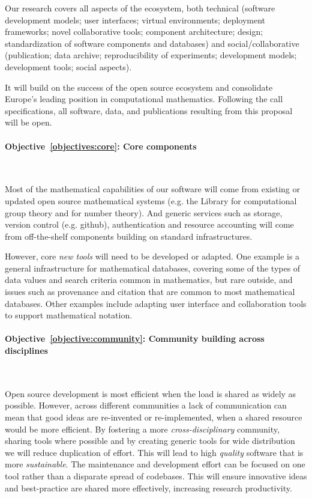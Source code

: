 \documentclass[noworkareas,deliverables,\classoptions]{euproposal}       %
\begin{document}
\begin{proposal}
Our research covers all aspects of the ecosystem, both technical
(software development models; user
    interfaces; virtual environments; deployment frameworks; novel
    collaborative tools; component architecture; design; 
    standardization of software components and databases)
and social/collaborative
(publication; data archive; reproducibility of experiments;
development models; development tools; social aspects). 

It will build on the success of the open source ecosystem and
consolidate Europe's leading position in computational mathematics.
Following the call specifications, all software, data, and
publications resulting from this proposal will be open.

\paragraph{Objective~\ref{objectives:core}: Core components}\

Most of the mathematical capabilities of our software will come
from existing or updated open source mathematical systems (e.g. the
\GAP Library for computational group theory and \PariGP for number
theory). And generic services such as storage, version control
(e.g. github), authentication and resource accounting will come from
off-the-shelf components building on standard infrastructures.

However, core \emph{new tools} will need to be developed or
adapted. One example is a general infrastructure for mathematical
databases, covering some of the types of data values and search
criteria common in mathematics, but rare outside, and issues such as
provenance and citation that are common to most mathematical
databases. Other examples include adapting user interface and
collaboration tools to support mathematical notation. 

\paragraph{Objective~\ref{objective:community}: Community building across disciplines}\ 

Open source development is most efficient when the load is shared as
widely as possible. However, across different communities a lack of
communication can mean that good ideas are re-invented or
re-implemented, when a shared resource would be more efficient. By
fostering a more \emph{cross-disciplinary} community, sharing tools
where possible and by creating generic tools for wide distribution we
will reduce duplication of effort. This will lead to high
\emph{quality} software that is more \emph{sustainable}. The
maintenance and development effort can be focused on one tool rather
than a disparate spread of codebases. This will ensure innovative
ideas and best-practice are shared more effectively, increasing
research productivity.


\end{proposal}
\end{document}
